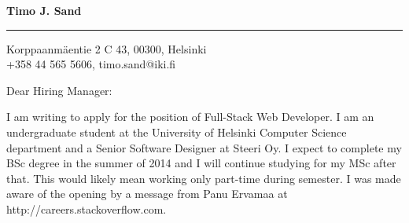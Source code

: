 \documentclass{letter} %
\begin{document}
\signature{Timo J. Sand}           %
\longindentation=0pt                       %
\let\raggedleft\raggedright                %


\begin{letter}{%
}


\begin{flushleft}
{\large\bf Timo J. Sand}
\end{flushleft}
\medskip\hrule height 1pt
\begin{flushright}
\hfill Korppaanmäentie 2 C 43, 00300, Helsinki \\
\hfill +358 44 565 5606, timo.sand@iki.fi
\end{flushright}
\vfill %


\opening{Dear Hiring Manager:}

\noindent
I am writing to apply for the position of Full-Stack Web Developer. I am an undergraduate student at the University of Helsinki Computer Science department and a Senior Software Designer at Steeri Oy. I expect to complete my BSc degree in the summer of 2014 and I will continue studying for my MSc after that. This would likely mean working only part-time during semester. I was made aware of the opening by a message from Panu Ervamaa at http://careers.stackoverflow.com.

\noindent


\end{letter}
\end{document}
